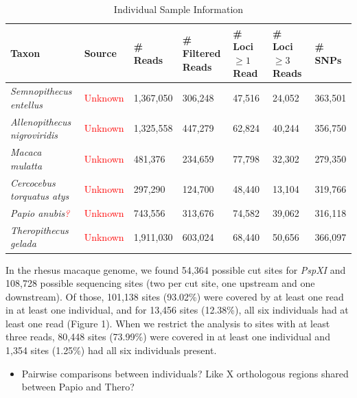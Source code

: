\documentclass[12pt]{article}
\begin{document}
\begin{table}[h]
\caption{Individual Sample Information}
\begin{center}
	\small
	\begin{tabular}{ p{3cm} || l || p{1.75cm} | p{1.75cm} || p{1.75cm} | p{1.75cm} | l }
		\hline
		Taxon & Source & \# Reads & \# Filtered Reads & \# Loci $\ge 1$ Read & \# Loci $\ge 3$ Reads & \# SNPs \\ \hline\hline
		\emph{Semnopithecus entellus} & \textcolor{red}{Unknown} & 1,367,050 & 306,248 & 47,516 & 24,052 & 363,501 \\ \hline
		\emph{Allenopithecus nigroviridis} & \textcolor{red}{Unknown} & 1,325,558 & 447,279 & 62,824 & 40,244 & 356,750 \\ \hline
		\emph{Macaca mulatta} & \textcolor{red}{Unknown} & 481,376 & 234,659 & 77,798 & 32,302 & 279,350 \\ \hline
		\emph{Cercocebus torquatus atys} & \textcolor{red}{Unknown} & 297,290 & 124,700 & 48,440 & 13,104 & 319,766 \\ \hline
		\emph{Papio anubis\textcolor{red}{?}} & \textcolor{red}{Unknown} & 743,556 & 313,676 & 74,582 & 39,062 & 316,118 \\ \hline
		\emph{Theropithecus gelada} & \textcolor{red}{Unknown} & 1,911,030 & 603,024 & 68,440 & 50,656 & 366,097 \\
		\hline
	\end{tabular}
\end{center}
\end{table}

In the rhesus macaque genome, we found 54,364 possible cut sites for \emph{PspXI} and 108,728 possible sequencing sites (two per cut site, one upstream and one downstream). Of those, 101,138 sites (93.02\%) were covered by at least one read in at least one individual, and for 13,456 sites (12.38\%), all six individuals had at least one read (Figure 1). When we restrict the analysis to sites with at least three reads, 80,448 sites (73.99\%) were covered in at least one individual and 1,354 sites (1.25\%) had all six individuals present.

\begin{itemize}
	\item Pairwise comparisons between individuals? Like X orthologous regions shared between Papio and Thero?
\end{itemize}
\end{document}
